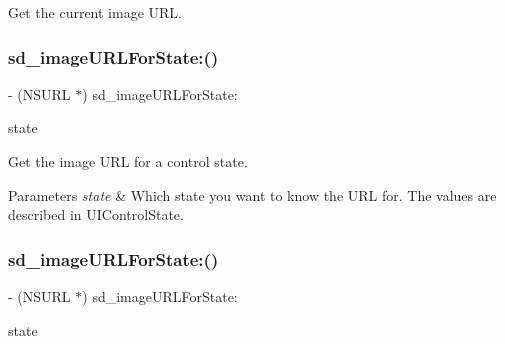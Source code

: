 Get the current image U\+RL. \mbox{\label{category_u_i_button_07_web_cache_08_a980c6b65dd457fcf4498763dd3e79ff0}} 
\subsubsection{\texorpdfstring{sd\+\_\+image\+U\+R\+L\+For\+State\+:()}{sd\_imageURLForState:()}\hspace{0.1cm}{\footnotesize\ttfamily [1/3]}}
{\footnotesize\ttfamily -\/ (N\+S\+U\+RL $\ast$) sd\+\_\+image\+U\+R\+L\+For\+State\+: \begin{DoxyParamCaption}\item[{(U\+I\+Control\+State)}]{state }\end{DoxyParamCaption}}

Get the image U\+RL for a control state.


\begin{DoxyParams}{Parameters}
{\em state} & Which state you want to know the U\+RL for. The values are described in U\+I\+Control\+State. \\
\hline
\end{DoxyParams}
\mbox{\label{category_u_i_button_07_web_cache_08_a980c6b65dd457fcf4498763dd3e79ff0}} 
\subsubsection{\texorpdfstring{sd\+\_\+image\+U\+R\+L\+For\+State\+:()}{sd\_imageURLForState:()}\hspace{0.1cm}{\footnotesize\ttfamily [2/3]}}
{\footnotesize\ttfamily -\/ (N\+S\+U\+RL $\ast$) sd\+\_\+image\+U\+R\+L\+For\+State\+: \begin{DoxyParamCaption}\item[{(U\+I\+Control\+State)}]{state }\end{DoxyParamCaption}}

